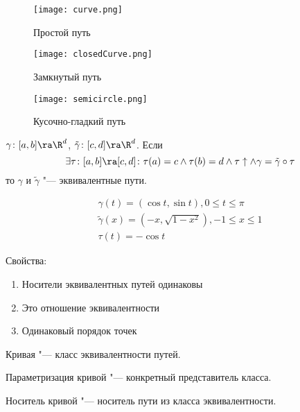 \begin{figure}[h]
	\begin{center}
		\begin{minipage}[h]{0.15\linewidth}
			\texttt{[image: curve.png]}
			\caption{Простой путь}
		\end{minipage}
		\begin{minipage}[h]{0.3\linewidth}
			\texttt{[image: closedCurve.png]}
			\caption{Замкнутый путь}
		\end{minipage}
		\begin{minipage}[h]{0.3\linewidth}
			\texttt{[image: semicircle.png]}
			\caption{Кусочно-гладкий путь}
		\end{minipage}
	\end{center}
\end{figure}

\begin{Def}
	$\gamma \colon [a, b] \ra \R^d$, $\tilde{\gamma} \colon [c, d] \ra \R^d$.
	Если
	\[ \exists \tau \colon [a, b] \ra [c, d]\colon \tau(a) = c \land \tau(b)=d \land \tau \uparrow \land \gamma = \tilde \gamma \circ \tau \]
	то $\gamma$ и $\tilde \gamma$ "--- эквивалентные пути.
\end{Def}

\begin{exmp}
	\begin{gather*}
		\gamma(t) = (\cos t, \sin t), 0 \le t \le \pi \\
		\tilde \gamma(x) = (-x, \sqrt{1 - x^2}), -1 \le x \le 1 \\
		\tau(t) = -\cos t
	\end{gather*}
\end{exmp}

Свойства:
\begin{enumerate}
	\item Носители эквивалентных путей одинаковы
	\item Это отношение эквивалентности
	\item Одинаковый порядок точек
\end{enumerate}

\begin{Def}
	Кривая "--- класс эквивалентности путей.
\end{Def}
\begin{Def}
	Параметризация кривой "--- конкретный представитель класса.
\end{Def}

\begin{Def}
	Носитель кривой "--- носитель пути из класса эквивалентности.
\end{Def}

